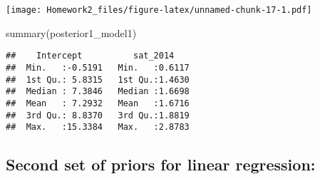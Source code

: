 \documentclass[
]{article}
\newenvironment{Shaded}{\begin{snugshade}}{\end{snugshade}}
\newcommand{\AttributeTok}[1]{\textcolor[rgb]{0.77,0.63,0.00}{#1}}
\newcommand{\CommentTok}[1]{\textcolor[rgb]{0.56,0.35,0.01}{\textit{#1}}}
\newcommand{\ControlFlowTok}[1]{\textcolor[rgb]{0.13,0.29,0.53}{\textbf{#1}}}
\newcommand{\DecValTok}[1]{\textcolor[rgb]{0.00,0.00,0.81}{#1}}
\newcommand{\FunctionTok}[1]{\textcolor[rgb]{0.00,0.00,0.00}{#1}}
\newcommand{\NormalTok}[1]{#1}
\newcommand{\OtherTok}[1]{\textcolor[rgb]{0.56,0.35,0.01}{#1}}
\newcommand{\SpecialCharTok}[1]{\textcolor[rgb]{0.00,0.00,0.00}{#1}}
\newcommand{\StringTok}[1]{\textcolor[rgb]{0.31,0.60,0.02}{#1}}
\begin{document}
\begin{Shaded}
\end{Shaded}

\texttt{[image: Homework2\_files/figure-latex/unnamed-chunk-17-1.pdf]}

\begin{Shaded}
\begin{Highlighting}[]
\FunctionTok{summary}\NormalTok{(posterior1\_model1)}
\end{Highlighting}
\end{Shaded}

\begin{verbatim}
##    Intercept          sat_2014     
##  Min.   :-0.5191   Min.   :0.6117  
##  1st Qu.: 5.8315   1st Qu.:1.4630  
##  Median : 7.3846   Median :1.6698  
##  Mean   : 7.2932   Mean   :1.6716  
##  3rd Qu.: 8.8370   3rd Qu.:1.8819  
##  Max.   :15.3384   Max.   :2.8783
\end{verbatim}

\hypertarget{second-set-of-priors-for-linear-regression}{%
\subsection{Second set of priors for linear
regression:}\label{second-set-of-priors-for-linear-regression}}
\end{document}
